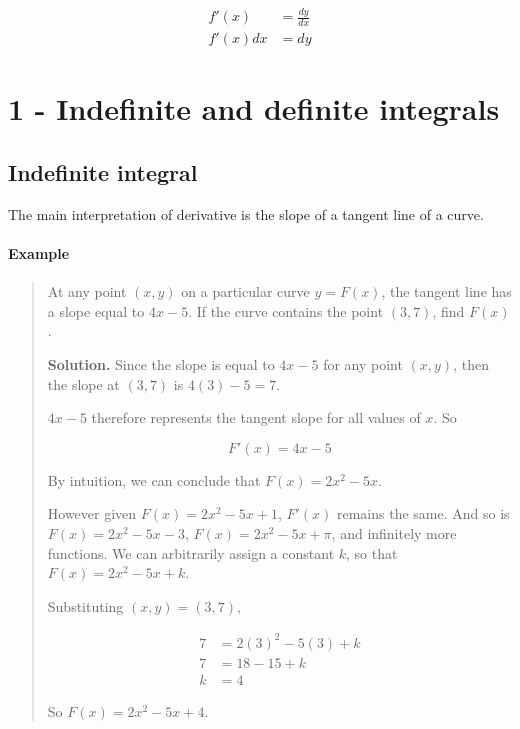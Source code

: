 \documentclass[
]{article}
\begin{document}
\begin{align*}
f'(x)&=\frac{dy}{dx}\\
f'(x)dx &= dy
\end{align*}

\hypertarget{indefinite-and-definite-integrals}{%
\section{1 - Indefinite and definite
integrals}\label{indefinite-and-definite-integrals}}

\hypertarget{indefinite-integral}{%
\subsection{Indefinite integral}\label{indefinite-integral}}

The main interpretation of derivative is the slope of a tangent line of
a curve.

\hypertarget{example-1}{%
\paragraph{Example}\label{example-1}}

\begin{quote}
At any point \((x,y)\) on a particular curve \(y=F(x)\), the tangent
line has a slope equal to \(4x-5\). If the curve contains the point
\((3,7)\), find \(F(x)\).

\textbf{Solution.} Since the slope is equal to \(4x-5\) for any point
\((x,y)\), then the slope at \((3,7)\) is \(4(3)-5=7\).

\(4x-5\) therefore represents the tangent slope for all values of \(x\).
So

\[ F'(x)=4x-5 \]

By intuition, we can conclude that \(F(x)=2x^2-5x\).

However given \(F(x)=2x^2-5x+1\), \(F'(x)\) remains the same. And so is
\(F(x)=2x^2-5x-3\), \(F(x)=2x^2-5x+\pi\), and infinitely more functions.
We can arbitrarily assign a constant \(k\), so that \(F(x)=2x^2-5x+k\).

Substituting \((x,y)=(3,7),\)

\begin{align*}
7 &= 2(3)^2 - 5(3) +k\\
7 &= 18 - 15 + k \\
k &= 4 
\end{align*}

So \(F(x)=2x^2-5x+4\).
\end{quote}
\end{document}
